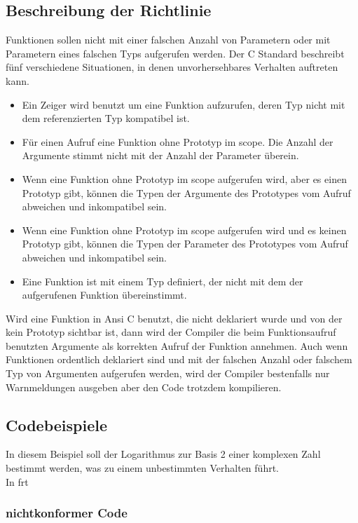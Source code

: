 \documentclass[12pt]{article}
\begin{document}
\subsection{Beschreibung der Richtlinie}
Funktionen sollen nicht mit einer falschen Anzahl von Parametern oder mit Parametern eines falschen Typs aufgerufen werden.
Der C Standard beschreibt f\"unf verschiedene Situationen, in denen unvorhersehbares Verhalten auftreten kann. 
\begin{itemize}
    \item Ein Zeiger wird benutzt um eine Funktion aufzurufen, deren Typ nicht mit dem referenzierten Typ kompatibel ist.
    \item F\"ur einen Aufruf eine Funktion ohne Prototyp im scope. Die Anzahl der Argumente stimmt nicht mit der Anzahl der Parameter \"uberein.
    \item Wenn eine Funktion ohne Prototyp im scope aufgerufen wird, aber es einen Prototyp gibt, k\"onnen die Typen der Argumente des Prototypes vom Aufruf abweichen und inkompatibel sein.
    \item Wenn eine Funktion ohne Prototyp im scope aufgerufen wird und es keinen Prototyp gibt, k\"onnen die Typen der Parameter des Prototypes vom Aufruf abweichen und inkompatibel sein.
    \item Eine Funktion ist mit einem Typ definiert, der nicht mit dem der aufgerufenen Funktion \"ubereinstimmt.
\end{itemize}

Wird eine Funktion in Ansi C benutzt, die nicht deklariert wurde und von der kein Prototyp sichtbar ist, dann wird der Compiler die beim Funktionsaufruf benutzten Argumente als korrekten Aufruf der Funktion annehmen. Auch wenn Funktionen ordentlich deklariert sind und mit der falschen Anzahl oder falschem Typ von Argumenten aufgerufen werden, wird der Compiler bestenfalls nur Warnmeldungen ausgeben aber den Code trotzdem kompilieren.

\newpage

\subsection{Codebeispiele}
	In diesem Beispiel soll der Logarithmus zur Basis 2 einer komplexen Zahl bestimmt werden, was zu einem unbestimmten Verhalten f\"uhrt.\\
	In frt  
\subsubsection{nichtkonformer Code}

\end{document}
